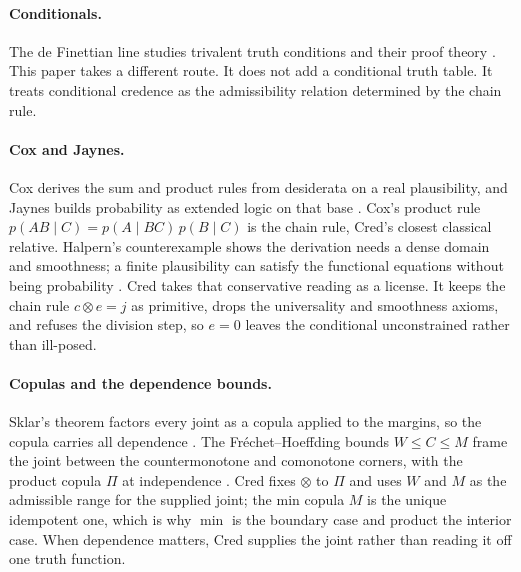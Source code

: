 \documentclass[11pt,a4paper]{article}
\newcommand{\conjc}{\otimes}
\begin{document}
\paragraph{Conditionals.}
The de Finettian line studies trivalent truth conditions and their
proof theory \cite{egre2020part1,egre2021,egre2025}.  This paper takes
a different route.  It does not add a conditional truth table.  It
treats conditional credence as the admissibility relation determined
by the chain rule.

\paragraph{Cox and Jaynes.}
Cox derives the sum and product rules from desiderata on a real
plausibility, and Jaynes builds probability as extended logic on that
base \cite{cox1946,cox1961,jaynes2003}.  Cox's product rule
$p(AB\mid C)=p(A\mid BC)\,p(B\mid C)$ is the chain rule, Cred's closest
classical relative.  Halpern's counterexample shows the derivation needs
a dense domain and smoothness; a finite plausibility can satisfy the
functional equations without being probability \cite{halpern1999}.  Cred
takes that conservative reading as a license.  It keeps the chain rule
$c\conjc e=j$ as primitive, drops the universality and smoothness axioms,
and refuses the division step, so $e=0$ leaves the conditional
unconstrained rather than ill-posed.

\paragraph{Copulas and the dependence bounds.}
Sklar's theorem factors every joint as a copula applied to the margins,
so the copula carries all dependence \cite{sklar1959}.  The
Fr\'echet--Hoeffding bounds $W\le C\le M$ frame the joint between the
countermonotone and comonotone corners, with the product copula $\Pi$ at
independence \cite{nelsen2006,dhaene2002}.  Cred fixes $\conjc$ to $\Pi$
and uses $W$ and $M$ as the admissible range for the supplied joint; the
min copula $M$ is the unique idempotent one, which is why $\min$ is the
boundary case and product the interior case.  When dependence matters,
Cred supplies the joint rather than reading it off one truth function.
\end{document}
